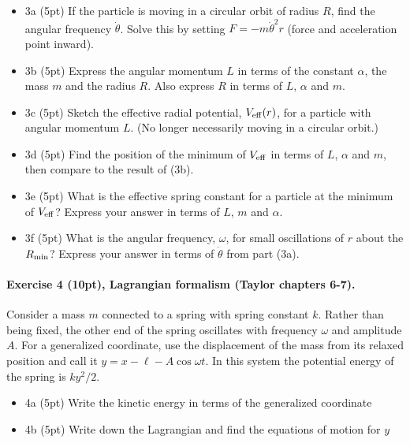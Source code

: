 \documentclass[%
oneside,                 %
final,                   %
10pt]{article}
\begin{document}
\begin{itemize}
\item 3a (5pt)  If the particle is moving in a circular orbit of radius $R$, find the angular frequency $\dot{\theta}$. Solve this by setting $F=-m\dot{\theta}^2r$ (force and acceleration point inward).

\item 3b (5pt) Express the angular momentum $L$ in terms of the constant $\alpha$, the mass $m$ and the radius $R$. Also express $R$ in terms of $L$, $\alpha$ and $m$.

\item 3c (5pt) Sketch the effective radial potential, $V_{\rm eff}(r)$, for a particle with angular momentum $L$. (No longer necessarily moving in a circular orbit.)

\item 3d (5pt)  Find the position of the minimum of $V_{\rm eff}$ in terms of $L$, $\alpha$ and $m$, then compare to the result of (3b).

\item 3e (5pt)  What is the effective spring constant for a particle at the minimum of $V_{\rm eff}$? Express your answer in terms of $L$, $m$ and $\alpha$. 

\item 3f (5pt)  What is the angular frequency, $\omega$, for small oscillations of $r$ about the $R_{\rm min}$?  Express your answer in terms of $\dot{\theta}$ from part (3a).
\end{itemize}

\noindent
\paragraph{Exercise 4 (10pt), Lagrangian formalism (Taylor chapters 6-7).}
Consider a mass $m$ connected to a spring with spring constant $k$. Rather than being fixed, the other end of the spring oscillates with frequency $\omega$ and amplitude $A$. For a generalized coordinate, use the displacement of the mass from its relaxed position and call it $y=x-\ell-A\cos\omega t$. In this system the potential energy of the spring is $ky^2/2$.

\begin{itemize}
\item 4a (5pt) Write the kinetic energy in terms of the generalized coordinate

\item 4b (5pt) Write down the Lagrangian and find the equations of motion for $y$
\end{itemize}
\end{document}
